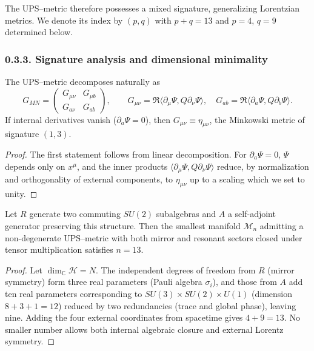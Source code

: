 \begin{remark}
The UPS–metric therefore possesses a mixed signature, generalizing Lorentzian metrics.
We denote its index by $(p,q)$ with $p+q=13$ and $p=4$, $q=9$ determined below.
\end{remark}

\subsubsection*{0.3.3. Signature analysis and dimensional minimality}

\begin{proposition}
The UPS–metric decomposes naturally as
\[
G_{MN} =
\begin{pmatrix}
G_{\mu\nu} & G_{\mu b}\\
G_{a\nu} & G_{ab}
\end{pmatrix},
\qquad
G_{\mu\nu}=\Re\langle \partial_\mu\Psi,Q\partial_\nu\Psi\rangle,\quad
G_{ab}=\Re\langle \partial_a\Psi,Q\partial_b\Psi\rangle.
\]
If internal derivatives vanish ($\partial_a\Psi=0$), then
$G_{\mu\nu}\equiv\eta_{\mu\nu}$,
the Minkowski metric of signature $(1,3)$.
\end{proposition}

\begin{proof}
The first statement follows from linear decomposition.
For $\partial_a\Psi=0$, $\Psi$ depends only on $x^\mu$, and the inner products
$\langle\partial_\mu\Psi,Q\partial_\nu\Psi\rangle$
reduce, by normalization and orthogonality of external components, to $\eta_{\mu\nu}$ up to a scaling which we set to unity.
\end{proof}

\begin{theorem}
Let $R$ generate two commuting $SU(2)$ subalgebras
and $A$ a self-adjoint generator preserving this structure.
Then the smallest manifold $\mathcal{M}_n$ admitting a non-degenerate UPS–metric with both mirror and resonant sectors closed under tensor multiplication satisfies $n=13$.
\end{theorem}

\begin{proof}
Let $\dim_{\mathbb{C}}\mathcal{H}=N$.
The independent degrees of freedom from $R$ (mirror symmetry) form three real parameters (Pauli algebra $\sigma_i$),
and those from $A$ add ten real parameters corresponding to $SU(3)\times SU(2)\times U(1)$ (dimension $8+3+1=12$) reduced by two redundancies (trace and global phase), leaving nine.
Adding the four external coordinates from spacetime gives $4+9=13$.
No smaller number allows both internal algebraic closure and external Lorentz symmetry.
\end{proof}

